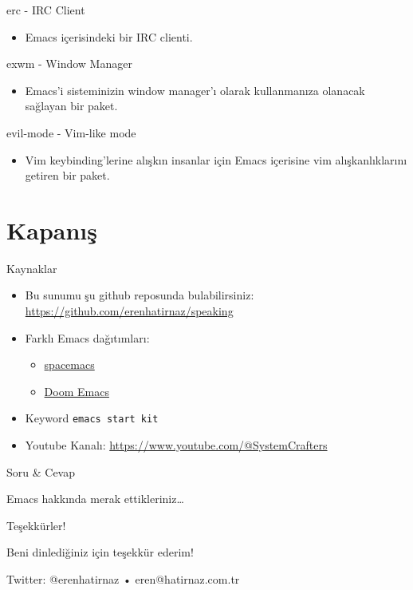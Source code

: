 \documentclass[presentation,smaller]{beamer}
\begin{document}
\begin{frame}[label={sec:orgc4ecb47}]{erc - IRC Client}
\begin{itemize}
\item Emacs içerisindeki bir IRC clienti.
\end{itemize}
\end{frame}
\begin{frame}[label={sec:org3008904}]{exwm - Window Manager}
\begin{itemize}
\item Emacs'i sisteminizin window manager'ı olarak kullanmanıza olanacak sağlayan bir
paket.
\end{itemize}
\end{frame}
\begin{frame}[label={sec:org73a933e}]{evil-mode - Vim-like mode}
\begin{itemize}
\item Vim keybinding'lerine alışkın insanlar için Emacs içerisine vim
alışkanlıklarını getiren bir paket.
\end{itemize}
\end{frame}
\section{Kapanış}
\label{sec:org4c6f3fc}
\begin{frame}[label={sec:org47ef86e},fragile]{Kaynaklar}
 \begin{itemize}
\item Bu sunumu şu github reposunda bulabilirsiniz: \url{https://github.com/erenhatirnaz/speaking}
\item Farklı Emacs dağıtımları:
\begin{itemize}
\item \href{https://github.com/syl20bnr/spacemacs/tree/develop}{spacemacs}
\item \href{https://github.com/doomemacs/doomemacs}{Doom Emacs}
\end{itemize}
\item Keyword \texttt{emacs start kit}
\item Youtube Kanalı: \url{https://www.youtube.com/@SystemCrafters}
\end{itemize}
\end{frame}
\begin{frame}[label={sec:orgf901058}]{Soru \& Cevap}
\begin{center}
Emacs hakkında merak ettikleriniz\ldots{}
\end{center}
\end{frame}
\begin{frame}[label={sec:orgf60cd0a}]{Teşekkürler!}
\begin{center}
\alert{\alert{Beni dinlediğiniz için teşekkür ederim!}}

\vspace{1in}

Twitter: @erenhatirnaz • eren@hatirnaz.com.tr
\end{center}
\end{frame}
\end{document}
